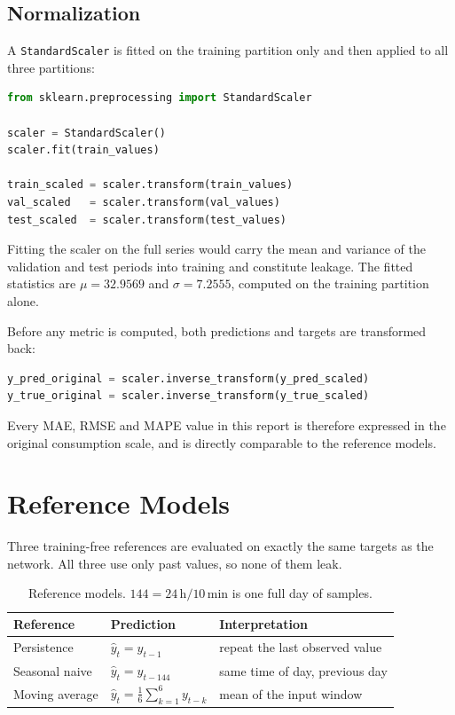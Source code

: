 \documentclass[11pt,a4paper]{article}
\begin{document}
\subsection{Normalization}
\label{sec:scaling}

A \texttt{StandardScaler} is fitted on the training partition only and then applied to all three
partitions:

\begin{lstlisting}[language=Python]
from sklearn.preprocessing import StandardScaler

scaler = StandardScaler()
scaler.fit(train_values)

train_scaled = scaler.transform(train_values)
val_scaled   = scaler.transform(val_values)
test_scaled  = scaler.transform(test_values)
\end{lstlisting}

\noindent
Fitting the scaler on the full series would carry the mean and variance of the validation and test
periods into training and constitute leakage. The fitted statistics are
$\mu = 32.9569$ and $\sigma = 7.2555$, computed on the training partition alone.

Before any metric is computed, both predictions and targets are transformed back:

\begin{lstlisting}[language=Python]
y_pred_original = scaler.inverse_transform(y_pred_scaled)
y_true_original = scaler.inverse_transform(y_true_scaled)
\end{lstlisting}

\noindent
Every MAE, RMSE and MAPE value in this report is therefore expressed in the original consumption
scale, and is directly comparable to the reference models.


\section{Reference Models}
\label{sec:references}

Three training-free references are evaluated on exactly the same targets as the network. All three
use only past values, so none of them leak.

\begin{table}[H]
\centering
\begin{tabular}{lll}
\toprule
\textbf{Reference} & \textbf{Prediction} & \textbf{Interpretation} \\
\midrule
Persistence     & $\hat{y}_t = y_{t-1}$                        & repeat the last observed value \\
Seasonal naive  & $\hat{y}_t = y_{t-144}$                      & same time of day, previous day \\
Moving average  & $\hat{y}_t = \frac{1}{6}\sum_{k=1}^{6} y_{t-k}$ & mean of the input window \\
\bottomrule
\end{tabular}
\caption{Reference models. $144 = 24\,\mathrm{h} / 10\,\mathrm{min}$ is one full day of samples.}
\end{table}
\end{document}
